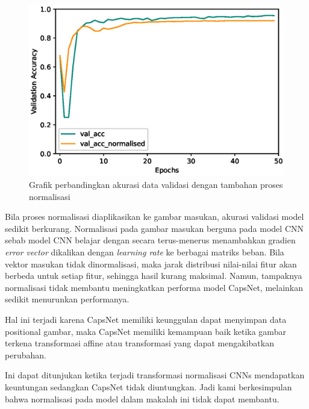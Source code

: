 \documentclass{article}
\begin{document}
   			\begin{figure}[H]
   				\centering
   				\includegraphics[scale=1]{analisis model/final_acc_norm.eps}
   				\caption{Grafik perbandingkan akurasi data validasi dengan tambahan proses normalisasi}
   			\end{figure}
   			
   			\par Bila proses normalisasi diaplikasikan ke gambar masukan, akurasi validasi model sedikit berkurang. Normalisasi pada gambar masukan berguna pada model CNN sebab model CNN belajar dengan secara terus-menerus menambahkan gradien \textit{error vector} dikalikan dengan \textit{learning rate} ke berbagai matriks beban. Bila vektor masukan tidak dinormalisasi, maka jarak distribusi nilai-nilai fitur akan berbeda untuk setiap fitur, sehingga hasil kurang maksimal. Namun, tampaknya normalisasi tidak membantu meningkatkan performa model CapsNet, melainkan sedikit menurunkan performanya.
   			\par
   			Hal ini terjadi karena 
   			CapsNet memiliki keunggulan dapat menyimpan data positional gambar, maka CapsNet memiliki kemampuan baik ketika gambar terkena transformasi affine atau 
   			transformasi yang dapat mengakibatkan perubahan.\par
   			Ini dapat ditunjukan ketika terjadi transformasi normalisasi CNNs mendapatkan keuntungan sedangkan CapsNet tidak diuntungkan. Jadi kami berkesimpulan
   			bahwa normalisasi pada model dalam makalah ini tidak dapat membantu.
   			
\end{document}
